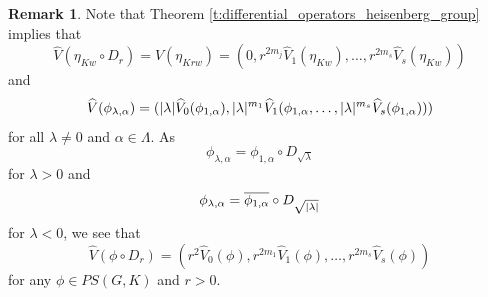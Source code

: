 \documentclass[12pt,reqno,a4paper]{amsart}
\theoremstyle{theorem}
\theoremstyle{definition}
\newtheorem{remark}[theorem]{Remark}
\numberwithin{theorem}{section}
\numberwithin{equation}{section}
\DeclarePairedDelimiter{\abs}{\lvert}{\rvert}
\begin{document}
\begin{remark} 
	Note that Theorem \ref{t:differential_operators_heisenberg_group} implies that
	\[\widehat{V}(\eta_{Kw}\circ D_r) = \widehat{V}(\eta_{Krw}) = (0, r^{2m_j}\widehat{V}_1(\eta_{Kw}),\dots,r^{2m_s}\widehat{V}_s(\eta_{Kw}))\]
	and
	\[\widehat{V}(\phi_{\lambda,\alpha}) = (\abs{\lambda}\widehat{V}_0(\phi_{1,\alpha}), \abs{\lambda}^{m_1}\widehat{V}_1(\phi_{1,\alpha},\dots, \abs{\lambda}^{m_s}\widehat{V}_s(\phi_{1,\alpha})))\]
	for all $\lambda\neq 0$ and $\alpha\in \Lambda$. As 
	\[\phi_{\lambda, \alpha} = \phi_{1,\alpha}\circ D_{\sqrt{\lambda}}\] for $\lambda>0$ and
	\[\phi_{\lambda, \alpha} = \overline{\phi_{1,\alpha}}\circ D_{\sqrt{\abs{\lambda}}}\] for $\lambda<0$,
	we see that
	\[\widehat{V}(\phi\circ D_r) = (r^2\widehat{V}_0(\phi), r^{2m_1}\widehat{V}_1(\phi),\dots, r^{2m_s}\widehat{V}_s(\phi))\]
	for any $\phi\in PS(G,K)$ and $r>0$.
\end{remark}
\end{document}
